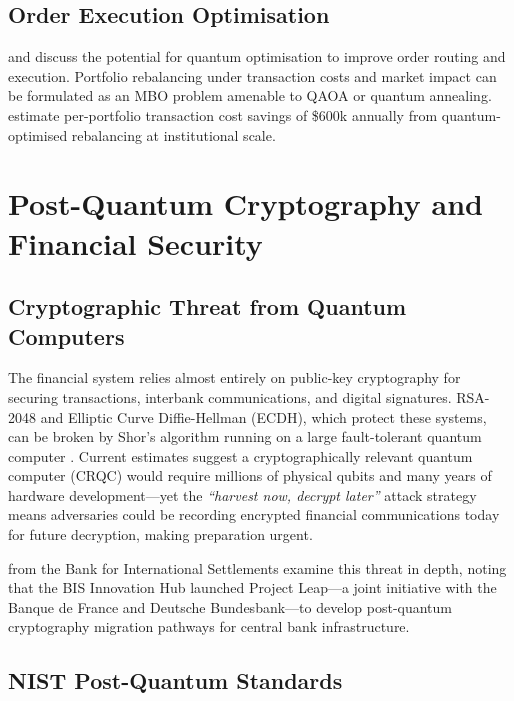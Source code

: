 \documentclass[12pt,a4paper]{article}
\begin{document}
\subsection{Order Execution Optimisation}

\citet{gupta_quantum_2024} and \citet{learning_ask_2024} discuss the potential for quantum optimisation to improve order routing and execution. Portfolio rebalancing under transaction costs and market impact can be formulated as an MBO problem amenable to QAOA or quantum annealing. \citet{egger_quantum_2020} estimate per-portfolio transaction cost savings of \$600k annually from quantum-optimised rebalancing at institutional scale.

\section{Post-Quantum Cryptography and Financial Security}
\label{sec:pqc}

\subsection{Cryptographic Threat from Quantum Computers}

The financial system relies almost entirely on public-key cryptography for securing transactions, interbank communications, and digital signatures. RSA-2048 and Elliptic Curve Diffie-Hellman (ECDH), which protect these systems, can be broken by Shor's algorithm running on a large fault-tolerant quantum computer \citep{auer_quantum_2024, hollebeek_impact_nodate}. Current estimates suggest a cryptographically relevant quantum computer (CRQC) would require millions of physical qubits and many years of hardware development---yet the \emph{``harvest now, decrypt later''} attack strategy means adversaries could be recording encrypted financial communications today for future decryption, making preparation urgent.

\citet{auer_quantum_2024} from the Bank for International Settlements examine this threat in depth, noting that the BIS Innovation Hub launched Project Leap---a joint initiative with the Banque de France and Deutsche Bundesbank---to develop post-quantum cryptography migration pathways for central bank infrastructure.

\subsection{NIST Post-Quantum Standards}
\end{document}
